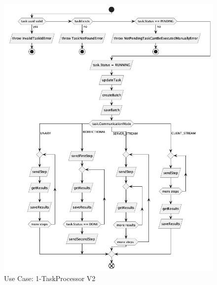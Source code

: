 \begin{figure}[H]
    \centering
    \includegraphics[height=0.7\textheight]{./part/Ejecucion/Seguimiento/MemoriaExplicativaDeCambios/img/1-TaskProcessor}
    \caption{Use Case: 1-TaskProcessor V2}\label{fig:1-TaskProcessorV2}
\end{figure}



